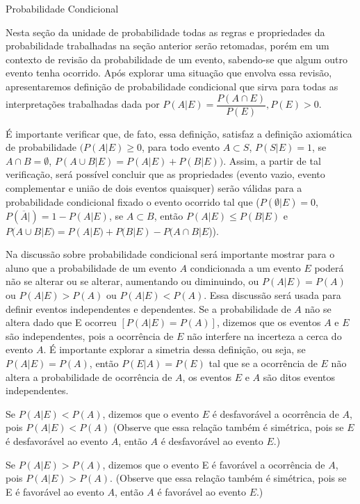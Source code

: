 \clearpage
\begin{paginatexto}{Probabilidade Condicional}

Nesta seção da unidade de probabilidade todas as regras e propriedades da probabilidade trabalhadas na seção anterior serão retomadas, porém em um contexto de revisão da probabilidade de um evento, sabendo-se que algum outro evento tenha ocorrido. Após explorar uma situação que envolva essa revisão, apresentaremos definição de probabilidade condicional que sirva para todas as interpretações trabalhadas dada por $P(A|E)=\dfrac{P(A\cap E)}{P(E)},  P(E)>0.$

É importante verificar que, de fato, essa definição, satisfaz a definição axiomática de probabilidade $(P(A|E)\geq0$, para todo evento $A\subset S$, $P(S|E)=1$, se $A\cap B=\emptyset$, $P(A\cup B|E)=P(A|E)+P(B|E))$. Assim, a partir de tal verificação, será possível concluir que as propriedades (evento vazio, evento complementar e união de dois eventos quaisquer) serão válidas para a probabilidade condicional fixado o evento ocorrido tal que ($P(\emptyset|E)=0$, $P(\overline{A}|)=1−P(A|E)$, se $A\subset B$, então $P(A|E)\leq P(B|E)$ e $P(A\cup B|E)=P(A|E)+P(B|E)−P(A\cap B|E$)).

Na discussão sobre probabilidade condicional será importante mostrar para o aluno que a probabilidade de um evento $A$ condicionada a um evento $E$ poderá não se alterar ou se alterar, aumentando ou diminuindo, ou $P(A|E)=P(A)$ ou $P(A|E)>P(A)$ ou $P(A|E)<P(A)$. Essa discussão será usada para definir eventos independentes e dependentes. Se a probabilidade de $A$ não se altera dado que E ocorreu $[P(A|E)=P(A)]$, dizemos que os eventos $A$ e $E$ são independentes, pois a ocorrência de $E$ não interfere na incerteza a cerca do evento $A$. É importante explorar a simetria dessa definição, ou seja, se $P(A|E)=P(A)$, então $P(E|A)=P(E)$ tal que se a ocorrência de $E$ não altera a probabilidade de ocorrência de $A$, os eventos $E$ e $A$ são ditos eventos independentes.

Se $P(A|E)<P(A)$, dizemos que o evento $E$ é desfavorável a ocorrência de $A$, pois $P(A|E)<P(A)$ (Observe que essa relação também é simétrica, pois se $E$ é desfavorável ao evento $A$, então $A$ é desfavorável ao evento $E$.)

Se $P(A|E)>P(A)$, dizemos que o evento E é favorável a ocorrência de $A$, pois $P(A|E)>P(A)$. (Observe que essa relação também é simétrica, pois se E é favorável ao evento $A$, então $A$ é favorável ao evento $E$.)


\end{paginatexto}
